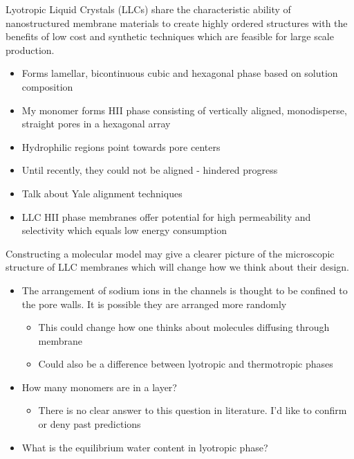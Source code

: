 \documentclass{article}
\begin{document}
	Lyotropic Liquid Crystals (LLCs) share the characteristic ability of nanostructured membrane materials to create highly ordered structures with the benefits of low cost and synthetic techniques which are feasible for large scale production.
	\begin{itemize}
		\item Forms lamellar, bicontinuous cubic and hexagonal phase based on solution composition
		\item My monomer forms HII phase consisting of vertically aligned, monodisperse, straight pores in a hexagonal array
		\item Hydrophilic regions point towards pore centers
		\item Until recently, they could not be aligned - hindered progress
		\item Talk about Yale alignment techniques
		\item LLC HII phase membranes offer potential for high permeability and selectivity which equals low energy consumption
	\end{itemize}
	
	Constructing a molecular model may give a clearer picture of the microscopic structure of LLC membranes which will change how we think about their design.
	\begin{itemize}
		\item The arrangement of sodium ions in the channels is thought to be confined to the pore walls. It is possible they are arranged more randomly
		\begin{itemize}
			\item This could change how one thinks about molecules diffusing through membrane
			\item Could also be a difference between lyotropic and thermotropic phases
		\end{itemize}
		\item How many monomers are in a layer?
		\begin{itemize}
			\item There is no clear answer to this question in literature. I'd like to confirm or deny past predictions
		\end{itemize}
		\item What is the equilibrium water content in lyotropic phase?
	\end{itemize}
	
\end{document}

